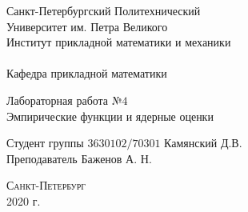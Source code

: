 \documentclass[a4]{article}
\begin{document}
\def\contentsname{\LARGE{Содержание}}
\thispagestyle{empty}
\begin{center} 
	
\vspace{2cm} 
{\Large \sc Санкт-Петербургский Политехнический}\\
\vspace{2mm}
{\Large \sc Университет} им. {\Large\sc Петра Великого}\\
\vspace{1cm}
{\large \sc Институт прикладной математики и механики\\ 
\vspace{0.5mm}
\textsc{}}\\ 
\vspace{0.5mm}
{\large\sc Кафедра прикладной математики}\\
\vspace{15mm}
{\huge \sc Лабораторная работа №$4$\\
	Эмпирические функции и ядерные оценки
	\vspace{6mm}
	
}
\vspace*{2mm}
\vspace{6cm} 
Студент группы $3630102/70301$ \hfill Камянский Д.В.\\
\vspace{1cm}
Преподаватель \hfill Баженов А. Н.\\
\vspace{20mm} 


\vfill {\large\textsc{Санкт-Петербург}}\\ 
2020 г.
\end{center}


\newpage
\pagestyle{plain}

\end{document}
